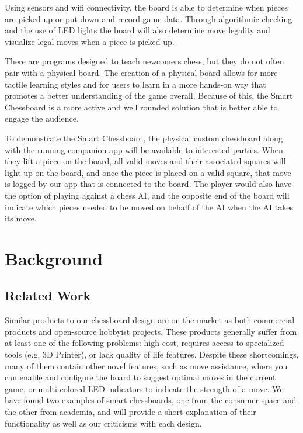 \documentclass[11pt,journal]{IEEEtran}
\begin{document}
Using sensors and wifi connectivity, the board is able to determine when pieces are picked up or put down and record game data. Through algorithmic checking and the use of LED lights the board will also determine move legality and visualize legal moves when a piece is picked up.

There are programs designed to teach newcomers chess, but they do not often pair with a physical board. The creation of a physical board allows for more tactile learning styles and for users to learn in a more hands-on way that promotes a better understanding of the game overall.  Because of this, the Smart Chessboard is a more active and well rounded solution that is better able to engage the audience.



To demonstrate the Smart Chessboard, the physical custom chessboard along with the running companion app will be available to interested parties. When they lift a piece on the board, all valid moves and their associated squares will light up on the board, and once the piece is placed on a valid square, that move is logged by our app that is connected to the board. The player would also have the option of playing against a chess AI, and the opposite end of the board will indicate which pieces needed to be moved on behalf of the AI when the AI takes its move.

\section{Background}



\subsection{Related Work}

Similar products to our chessboard design are on the market as both commercial products and open-source hobbyist projects. These products generally suffer from at least one of the following problems: high cost, requires access to specialized tools (e.g. 3D Printer), or lack quality of life features. Despite these shortcomings, many of them contain other novel features, such as move assistance, where you can enable and configure the board to suggest optimal moves in the current game, or multi-colored LED indicators to indicate the strength of a move. We have found two examples of smart chessboards, one from the consumer space and the other from academia, and will provide a short explanation of their functionality as well as our criticisms with each design.
\end{document}
